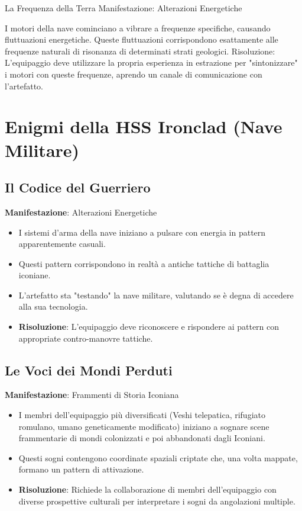 \documentclass[letterpaper,twocolumn,openany,nodeprecatedcode]{dndbook}
\begin{document}
La Frequenza della Terra
Manifestazione: Alterazioni Energetiche

I motori della nave cominciano a vibrare a frequenze specifiche, causando fluttuazioni energetiche.
Queste fluttuazioni corrispondono esattamente alle frequenze naturali di risonanza di determinati strati geologici.
Risoluzione: L'equipaggio deve utilizzare la propria esperienza in estrazione per "sintonizzare" i motori con queste frequenze, aprendo un canale di comunicazione con l'artefatto.



\section{Enigmi della HSS Ironclad (Nave Militare)}
\subsection{Il Codice del Guerriero}
\textbf{Manifestazione}: Alterazioni Energetiche

\begin{itemize}
    \item I sistemi d'arma della nave iniziano a pulsare con energia in pattern apparentemente casuali.
    \item Questi pattern corrispondono in realtà a antiche tattiche di battaglia iconiane.
    \item L'artefatto sta "testando" la nave militare, valutando se è degna di accedere alla sua tecnologia.
    \item \textbf{Risoluzione}: L'equipaggio deve riconoscere e rispondere ai pattern con appropriate contro-manovre tattiche.
\end{itemize}

\subsection{Le Voci dei Mondi Perduti}
\textbf{Manifestazione}: Frammenti di Storia Iconiana

\begin{itemize}
    \item I membri dell'equipaggio più diversificati (Veshi telepatica, rifugiato romulano, umano geneticamente modificato) iniziano a sognare scene frammentarie di mondi colonizzati e poi abbandonati dagli Iconiani.
    \item Questi sogni contengono coordinate spaziali criptate che, una volta mappate, formano un pattern di attivazione.
    \item \textbf{Risoluzione}: Richiede la collaborazione di membri dell'equipaggio con diverse prospettive culturali per interpretare i sogni da angolazioni multiple.
\end{itemize}
\end{document}
